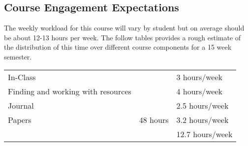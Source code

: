 \documentclass[nobib]{tufte-handout}
\begin{document}
\subsection{Course Engagement Expectations}

The weekly workload for this course will vary by student but on average should be about 12-13 hours per week.  The follow tables provides a rough estimate of the distribution of this time over different course components for a 15 week semester.
\begin{center}
\begin{tabular}{|l|l|l|}
\hline
In-Class &      & 3 hours/week \\
Finding and working with resources &        & 4 hours/week \\
Journal &   & 2.5 hours/week \\
Papers & 48 hours & 3.2 hours/week \\
\hline
& & 12.7 hours/week \\
\hline
\end{tabular}
\end{center}
\end{document}
